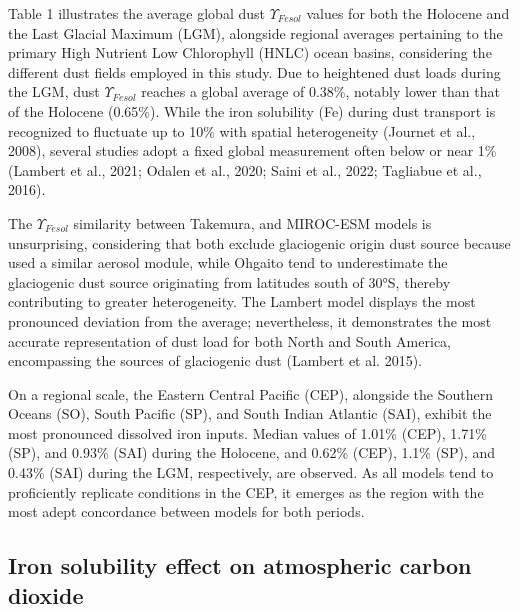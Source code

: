 Table 1 illustrates the average global dust $\Upsilon_{Fesol}$ values for both the Holocene and the Last Glacial Maximum (LGM), alongside regional averages pertaining to the primary High Nutrient Low Chlorophyll (HNLC) ocean basins, considering the different dust fields employed in this study. Due to heightened dust loads during the LGM, dust $\Upsilon_{Fesol}$ reaches a global average of 0.38\%, notably lower than that of the Holocene (0.65\%). While the iron solubility (Fe) during dust transport is recognized to fluctuate up to 10\% with spatial heterogeneity (Journet et al., 2008), several studies adopt a fixed global measurement often below or near 1\% (Lambert et al., 2021; Odalen et al., 2020; Saini et al., 2022; Tagliabue et al., 2016).

The $\Upsilon_{Fesol}$ similarity between Takemura, and MIROC-ESM models is unsurprising, considering that both exclude glaciogenic origin dust source because used a similar aerosol module, while Ohgaito tend to underestimate the glaciogenic dust source originating from latitudes south of 30°S, thereby contributing to greater heterogeneity. The Lambert model displays the most pronounced deviation from the average; nevertheless, it demonstrates the most accurate representation of dust load for both North and South America, encompassing the sources of glaciogenic dust (Lambert et al. 2015).

On a regional scale, the Eastern Central Pacific (CEP), alongside the Southern Oceans (SO), South Pacific (SP), and South Indian Atlantic (SAI), exhibit the most pronounced dissolved iron inputs. Median values of 1.01\% (CEP), 1.71\% (SP), and 0.93\% (SAI) during the Holocene, and 0.62\% (CEP), 1.1\% (SP), and 0.43\% (SAI) during the LGM, respectively, are observed. As all models tend to proficiently replicate conditions in the CEP, it emerges as the region with the most adept concordance between models for both periods.

\subsection{Iron solubility effect on atmospheric carbon dioxide }

